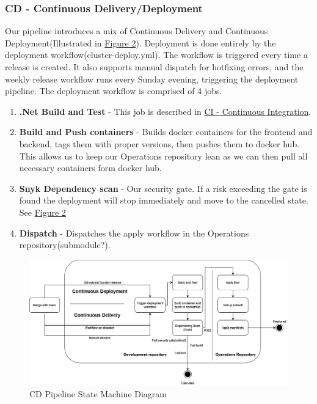 \subsubsection{CD - Continuous Delivery/Deployment}
\label{subsubsec:cd}

Our pipeline introduces a mix of Continuous Delivery and Continuous Deployment(Illustrated in \hyperref[fig:CDStateMachine]{Figure 2}). Deployment is done entirely by the deployment workflow(cluster-deploy.yml).
The workflow is triggered every time a release is created. It also supports manual dispatch for hotfixing errors, and the weekly release workflow runs every Sunday evening, triggering the deployment pipeline. The deployment workflow is comprised of 4 jobs.
\begin{enumerate}
    \item \textbf{.Net Build and Test} - This job is described in \hyperref[subsubsec:ci]{CI - Continuous Integration}.
    \item \textbf{Build and Push containers} - Builds docker containers for the frontend and backend, tags them with proper versions, then pushes them to docker hub. This allows us to keep our Operations repository lean as we can then pull all necessary containers form docker hub.
    \item \textbf{Snyk Dependency scan} - Our security gate. If a risk exceeding the gate is found the deployment will stop immediately and move to the cancelled state. See \hyperref[fig:CDStateMachine]{Figure 2}
    \item \textbf{Dispatch} - Dispatches the apply workflow in the Operations repository(submodule?).
\end{enumerate}

\begin {figure}[H]
    \centering
    \includegraphics[scale=0.50]{images/DevopsDiagrams-StateMachineCd.drawio.png}
    \caption{CD Pipeline State Machine Diagram}
    \label{fig:CDStateMachine}
\end{figure}

